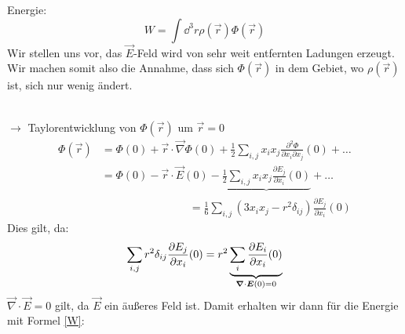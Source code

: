 \begin{minipage}{.6\linewidth}
	Energie:
	\begin{equation}
	W=\int\dd^3r\rho(\vec{r})\Phi(\vec{r})
	\label{W}
	\end{equation}
	Wir stellen uns vor, das $ \vec{E} $-Feld wird von sehr weit entfernten Ladungen erzeugt. Wir machen somit also die Annahme, dass sich $\Phi(\vec{r})$ in dem Gebiet, wo $ \rho(\vec{r}) $ ist, sich nur wenig ändert.
\end{minipage}%
\begin{minipage}{.4\linewidth}
	\centering
\end{minipage}%
\\
$\rightarrow$ Taylorentwicklung von $\Phi(\vec{r})$ um $\vec{r}=0$\\
\begin{align*}
\Phi(\vec{r}) &= \Phi(0) + \vec{r} \cdot \vec{\nabla} \Phi(0) + \frac{1}{2} \sum_{i,j} x_i x_j \frac{\partial^2\Phi}{\partial x_i\partial x_j} (0) + \ldots \\
&= \Phi(0) - \vec{r} \cdot \vec{E} (0) - \underbrace{\frac{1}{2} \sum_{i,j} x_i x_j \frac{\partial E_j}{\partial x_i} (0)}_{} + \ldots\\
& \qquad \qquad \qquad \qquad = \frac{1}{6} \sum_{i,j} (3 x_i x_j - r^2 \delta_{ij}) \frac{\partial E_j}{\partial x_i} (0) 
\end{align*}
Dies gilt, da:
$$\sum_{i,j}r^2\delta_{ij}\frac{\partial E_j}{\partial x_i}(0)=r^2\underbrace{\sum_i\frac{\partial E_i}{\partial x_i}(0)}_{\mathclap{\vec{\nabla}\cdot\vec{E}(0)=0}}$$
$ \vec{\nabla} \cdot \vec{E} = 0 $ gilt, da $ \vec{E} $ ein äußeres Feld ist.
Damit erhalten wir dann für die Energie mit Formel \eqref{W}:
